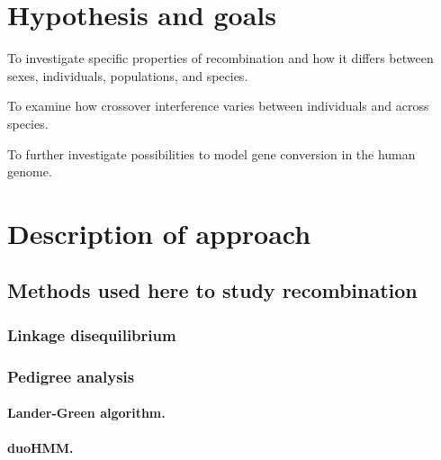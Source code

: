 \section{Hypothesis and goals}

\begin{titemize}
    \item To investigate specific properties of recombination and how it differs between sexes, individuals, populations, and species.
    \item To examine how crossover interference varies between individuals and across species.
    \item To further investigate possibilities to model gene conversion in the human genome.
\end{titemize}

\section{Description of approach}

\subsection{Methods used here to study recombination}
\subsubsection{Linkage disequilibrium}
\subsubsection{Pedigree analysis}
\paragraph{Lander-Green algorithm.}
\paragraph{duoHMM.}

